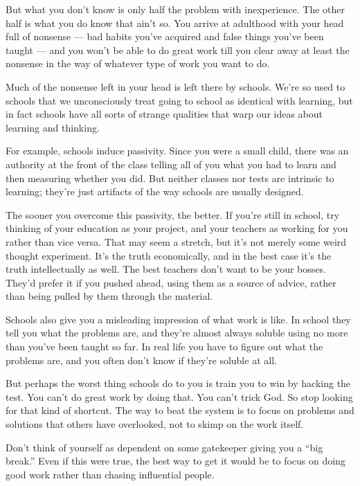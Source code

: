 But what you don't know is only half the problem with inexperience. The
other half is what you do know that ain't so. You arrive at adulthood
with your head full of nonsense --- bad habits you've acquired and false
things you've been taught --- and you won't be able to do great work
till you clear away at least the nonsense in the way of whatever type of
work you want to do.

Much of the nonsense left in your head is left there by schools. We're
so used to schools that we unconsciously treat going to school as
identical with learning, but in fact schools have all sorts of strange
qualities that warp our ideas about learning and thinking.

For example, schools induce passivity. Since you were a small child,
there was an authority at the front of the class telling all of you what
you had to learn and then measuring whether you did. But neither classes
nor tests are intrinsic to learning; they're just artifacts of the way
schools are usually designed.

The sooner you overcome this passivity, the better. If you're still in
school, try thinking of your education as your project, and your
teachers as working for you rather than vice versa. That may seem a
stretch, but it's not merely some weird thought experiment. It's the
truth economically, and in the best case it's the truth intellectually
as well. The best teachers don't want to be your bosses. They'd prefer
it if you pushed ahead, using them as a source of advice, rather than
being pulled by them through the material.

Schools also give you a misleading impression of what work is like. In
school they tell you what the problems are, and they're almost always
soluble using no more than you've been taught so far. In real life you
have to figure out what the problems are, and you often don't know if
they're soluble at all.

But perhaps the worst thing schools do to you is train you to win by
hacking the test. You can't do great work by doing that. You can't trick
God. So stop looking for that kind of shortcut. The way to beat the
system is to focus on problems and solutions that others have
overlooked, not to skimp on the work itself.

Don't think of yourself as dependent on some gatekeeper giving you a
``big break.'' Even if this were true, the best way to get it would be
to focus on doing good work rather than chasing influential people.

